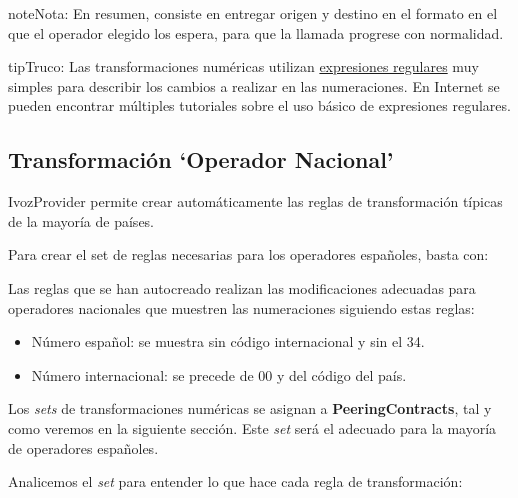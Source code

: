 \documentclass[letterpaper,10pt,spanish]{sphinxmanual}
\begin{document}
\begin{notice}{note}{Nota:}
En resumen, consiste en entregar origen y destino en el formato en el que el operador elegido los espera, para que la llamada progrese con normalidad.
\end{notice}

\begin{notice}{tip}{Truco:}
Las transformaciones numéricas utilizan \href{https://es.wikipedia.org/wiki/Expresi\%C3\%B3n\_regular}{expresiones regulares} muy simples para describir los cambios a realizar en las numeraciones. En Internet se pueden encontrar múltiples tutoriales sobre el uso básico de expresiones regulares.
\end{notice}


\subsection{Transformación `Operador Nacional'}
\label{external_incoming_calls/numeric_transformations:national-provider-transformations}
IvozProvider permite crear automáticamente las reglas de transformación típicas de la mayoría de países.

Para crear el set de reglas necesarias para los operadores españoles, basta con:


Las reglas que se han autocreado realizan las modificaciones adecuadas para operadores nacionales que muestren las numeraciones siguiendo estas reglas:
\begin{itemize}
\item {} 
Número español: se muestra sin código internacional y sin el 34.

\item {} 
Número internacional: se precede de 00 y del código del país.

\end{itemize}

Los \emph{sets} de transformaciones numéricas se asignan a \textbf{PeeringContracts}, tal y como veremos en la siguiente sección. Este \emph{set} será el adecuado para la mayoría de operadores españoles.

Analicemos el \emph{set} para entender lo que hace cada regla de transformación:

\noindent{}
\end{document}
